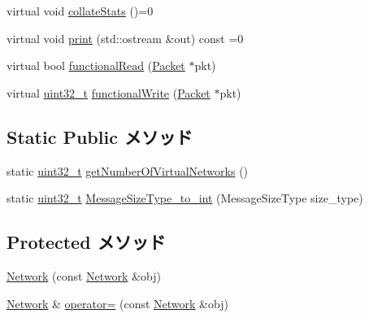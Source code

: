 \begin{DoxyCompactItemize}
\item 
virtual void \hyperlink{classNetwork_ab6b1b00ea63b4d41ec52e154052d47ee}{collateStats} ()=0
\item 
virtual void \hyperlink{classNetwork_a3ea5f7af5db62cc24f4e40df9ea5c971}{print} (std::ostream \&out) const =0
\item 
virtual bool \hyperlink{classNetwork_a32ecdf2d815f1224a090f1d2b27b2c00}{functionalRead} (\hyperlink{classPacket}{Packet} $\ast$pkt)
\item 
virtual \hyperlink{Type_8hh_a435d1572bf3f880d55459d9805097f62}{uint32\_\-t} \hyperlink{classNetwork_a31a4b7e2a90a59a684d84d1284683986}{functionalWrite} (\hyperlink{classPacket}{Packet} $\ast$pkt)
\end{DoxyCompactItemize}
\subsection*{Static Public メソッド}
\begin{DoxyCompactItemize}
\item 
static \hyperlink{Type_8hh_a435d1572bf3f880d55459d9805097f62}{uint32\_\-t} \hyperlink{classNetwork_ad5f3f9c517eb104939162472860e9637}{getNumberOfVirtualNetworks} ()
\item 
static \hyperlink{Type_8hh_a435d1572bf3f880d55459d9805097f62}{uint32\_\-t} \hyperlink{classNetwork_a0e60f76f594bf5e23a9b0dbcdde63cad}{MessageSizeType\_\-to\_\-int} (MessageSizeType size\_\-type)
\end{DoxyCompactItemize}
\subsection*{Protected メソッド}
\begin{DoxyCompactItemize}
\item 
\hyperlink{classNetwork_a287984c6c6962bfd126e05b10c13a511}{Network} (const \hyperlink{classNetwork}{Network} \&obj)
\item 
\hyperlink{classNetwork}{Network} \& \hyperlink{classNetwork_a904d771fc938af1e3c0cafaa20d13923}{operator=} (const \hyperlink{classNetwork}{Network} \&obj)
\end{DoxyCompactItemize}
